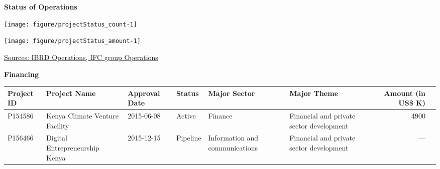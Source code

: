 \documentclass{article}\usepackage[]{graphicx}\usepackage[]{color}
\makeatletter
\def\maxwidth{ %
  \ifdim\Gin@nat@width>\linewidth
    \linewidth
  \else
    \Gin@nat@width
  \fi
}
\makeatother
\begin{document}
\begin{minipage}[b]{0.99\textwidth} %
\vspace*{0.5cm}
\raggedright{\color{white!30!blue} \textbf{\large Status of Operations}}
     \vspace*{0.5cm}
     
  \begin{minipage}[t]{0.99\textwidth}
    \begin{minipage}[c]{0.49\textwidth}
      \vspace*{0.2cm}
      \vspace*{0.3cm}


{\centering \texttt{[image: figure/projectStatus\_count-1]} 

}



      \end{minipage}
      \begin{minipage}[c]{0.49\textwidth}


{\centering \texttt{[image: figure/projectStatus\_amount-1]} 

}



      \end{minipage}
 
\raggedright{\footnotesize{\href{http://www.worldbank.org/en/topic/macroeconomics/overview}{Sources: IBRD Operations, IFC group Operations}}}
   \end{minipage}
  
   \begin{minipage}[b]{0.99\textwidth} %
     \vspace*{1cm}
     \begin{minipage}[c]{0.99\textwidth}  
     \raggedright{\color{white!30!blue} \textbf{\large Financing}}
     \vspace*{0.5cm}
     
{\footnotesize
\begin{tabular}{l>{\raggedright}p{1in}ll>{\raggedright}p{1in}>{\raggedright}p{1in}rl}
 Project ID & Project Name & Approval Date & Status & Major Sector & Major Theme & Amount (in US\$ K) &  \\ 
  \hline
P154586 & Kenya Climate Venture Facility & 2015-06-08 & Active & Finance & Financial and private sector development & 4900 &  \\ 
  P156466 & Digital Entrepreneurship Kenya & 2015-12-15 & Pipeline & Information and communications & Financial and private sector development & ---  &  \\ 
  \end{tabular}
}


\end{minipage}
\end{minipage}
\end{minipage}
\end{document}
